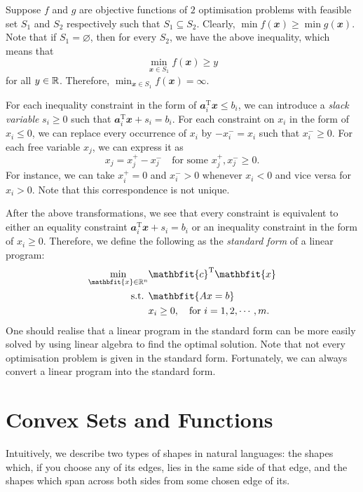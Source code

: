 \documentclass[math, code]{amznotes}
\theoremstyle{remark}
\begin{document}
Suppose $f$ and $g$ are objective functions of $2$ optimisation problems with feasible set $S_1$ and $S_2$ respectively such that $S_1 \subseteq S_2$. Clearly, $\min f(\mathbfit{x}) \geq \min g(\mathbfit{x})$. Note that if $S_1 = \varnothing$, then for every $S_2$, we have the above inequality, which means that
\begin{equation*}
    \min_{\mathbfit{x} \in S_1} f(\mathbfit{x}) \geq y
\end{equation*}
for all $y \in \mathbb{R}$. Therefore, $\min_{\mathbfit{x} \in S_1} f(\mathbfit{x}) = \infty$.

For each inequality constraint in the form of $\mathbfit{a}_i^{\mathrm{T}}\mathbfit{x} \leq b_i$, we can introduce a \textit{slack variable} $s_i \geq 0$ such that $\mathbfit{a}_i^{\mathrm{T}}\mathbfit{x} + s_i = b_i$. For each constraint on $x_i$ in the form of $x_i \leq 0$, we can replace every occurrence of $x_i$ by $-x_i^- = x_i$ such that $x_i^- \geq 0$. For each free variable $x_j$, we can express it as 
\begin{equation*}
    x_j = x_j^+ - x_j^- \quad \textrm{for some } x_j^+, x_j^- \geq 0.
\end{equation*}
For instance, we can take $x_i^+ = 0$ and $x_i^- > 0$ whenever $x_i < 0$ and vice versa for $x_i > 0$. Note that this correspondence is not unique.

After the above transformations, we see that every constraint is equivalent to either an equality constraint $\mathbfit{a}_i^{\mathrm{T}}\mathbfit{x} + s_i = b_i$ or an inequality constraint in the form of $x_i \geq 0$. Therefore, we define the following as the \textit{standard form} of a linear program:
\begin{align*}
    \min_{\mathbfit{x} \in \R^n} & \mathbfit{c}^{\mathrm{T}}\mathbfit{x} \\
    \textrm{s.t. } & \mathbfit{Ax = b} \\
    & x_i \geq 0, \quad \textrm{for } i = 1, 2, \cdots, m.
\end{align*}
One should realise that a linear program in the standard form can be more easily solved by using linear algebra to find the optimal solution. Note that not every optimisation problem is given in the standard form. Fortunately, we can always convert a linear program into the standard form.
\section{Convex Sets and Functions}
Intuitively, we describe two types of shapes in natural languages: the shapes which, if you choose any of its edges, lies in the same side of that edge, and the shapes which span across both sides from some chosen edge of its.
\end{document}
